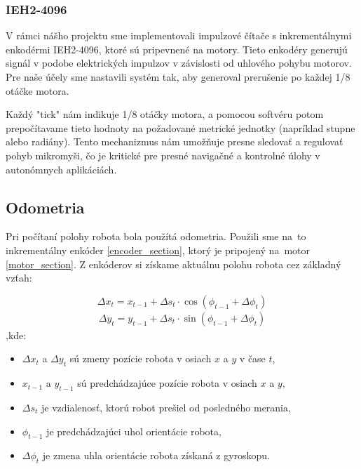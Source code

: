 \subsubsection{IEH2-4096}
V rámci nášho projektu sme implementovali impulzové čítače s inkrementálnymi enkodérmi IEH2-4096, ktoré sú pripevnené na motory. Tieto enkodéry generujú signál v podobe elektrických impulzov v závislosti od uhlového pohybu motorov. Pre naše účely sme nastavili systém tak, aby generoval prerušenie po každej 1/8 otáčke motora.

Každý "tick" nám indikuje 1/8 otáčky motora, a pomocou softvéru potom prepočítavame tieto hodnoty na požadované metrické jednotky (napríklad stupne alebo radiány). Tento mechanizmus nám umožňuje presne sledovať a regulovať pohyb mikromyši, čo je kritické pre presné navigačné a kontrolné úlohy v autonómnych aplikáciách.
\newpage
\subsection{Odometria}
\label{subsec:odometria}

Pri počítaní polohy robota bola použítá odometria.
Použili sme na~to inkrementálny enkóder \ref{encoder_section}, ktorý je pripojený na~motor \ref{motor_section}. Z enkóderov si získame aktuálnu polohu robota
cez základný vzťah:

\begin{equation}
	\label{eq:odometria}
	 \Delta x_t = x_{t-1} + \Delta s_t \cdot \cos(\phi_{t-1} + \Delta \phi_t)
\end{equation}
\begin{align}
	\Delta y_t = y_{t-1} + \Delta s_t \cdot \sin(\phi_{t-1} + \Delta \phi_t)
\end{align}
,kde:
\begin{itemize}
	\item $\Delta x_t$ a $\Delta y_t$ sú zmeny pozície robota v osiach $x$ a $y$ v čase $t$,
	\item $x_{t-1}$ a $y_{t-1}$ sú predchádzajúce pozície robota v osiach $x$ a $y$,
	\item $\Delta s_t$ je vzdialenosť, ktorú robot prešiel od posledného merania,
	\item $\phi_{t-1}$ je predchádzajúci uhol orientácie robota,
	\item $\Delta \phi_t$ je zmena uhla orientácie robota získaná z gyroskopu.
\end{itemize}

